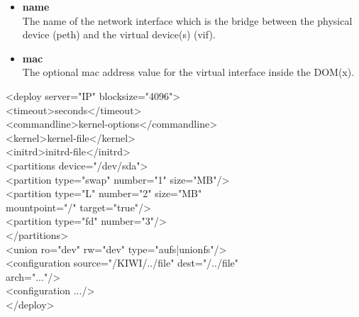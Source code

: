 \begin{itemize}
\item \textbf{name}\\
      The name of the network interface which is the bridge between
      the physical device (peth) and the virtual device(s) (vif).
\item \textbf{mac}\\
      The optional mac address value for the virtual interface inside
      the DOM(x).
\end{itemize}

\begin{Command}{14cm}
<deploy server="IP" blocksize="4096">\\
\hspace*{1cm}<timeout>seconds</timeout>\\
\hspace*{1cm}<commandline>kernel-options</commandline>\\
\hspace*{1cm}<kernel>kernel-file</kernel>\\
\hspace*{1cm}<initrd>initrd-file</initrd>\\
\hspace*{1cm}<partitions device="/dev/sda">\\
\hspace*{2cm}<partition type="swap" number="1" size="MB"/>\\
\hspace*{2cm}<partition type="L" number="2" size="MB"\\
\hspace*{4.5cm}mountpoint="/" target="true"/>\\
\hspace*{2cm}<partition type="fd" number="3"/>\\
\hspace*{1cm}</partitions>\\
\hspace*{1cm}<union ro="dev" rw="dev" type="aufs|unionfs"/>\\
\hspace*{1cm}<configuration source="/KIWI/../file" dest="/../file"\\
\hspace*{4.5cm}arch="..."/>\\
\hspace*{1cm}<configuration .../>\\
</deploy>
\end{Command}

